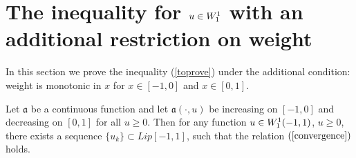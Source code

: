 \section{The inequality for $u \in W_1^1$ with an additional restriction on weight}
\label{ASC}

In this section we prove the inequality (\ref{toprove}) under the additional condition:
weight is monotonic in $x$ for $x \in [-1, 0]$ and $x \in [0, 1]$.

\begin{lm}
\label{Wapprox}
Let $\mathfrak a$ be a continuous function
and let $\mathfrak a(\cdot, u)$ be increasing on $[-1, 0]$ and decreasing on $[0, 1]$ for all $u \ge 0$.
Then for any function $u \in W_1^1(-1, 1)$, $u \ge 0$,
there exists a sequence $\{u_k\} \subset Lip[-1, 1]$, such that the relation $(\ref{convergence})$ holds.
\end{lm}

